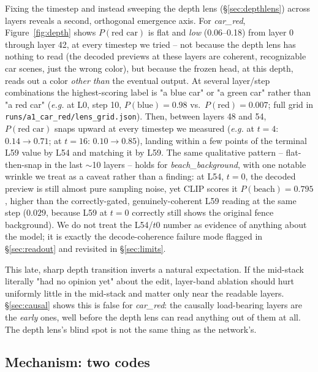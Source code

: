 \documentclass[10pt,twocolumn]{article}
\newcommand{\eg}{\emph{e.g.}}
\begin{document}
Fixing the timestep and instead sweeping the depth lens (\S\ref{sec:depthlens})
across layers reveals a second, orthogonal emergence axis. For
\emph{car\_red}, Figure~\ref{fig:depth} shows $P(\text{red car})$ is flat
and \emph{low} (0.06--0.18) from layer 0 through layer 42, at every
timestep we tried -- not because the depth lens has nothing to read
(the decoded previews at these layers are coherent, recognizable car
scenes, just the wrong color), but because the frozen head, at this
depth, reads out a color \emph{other than} the eventual output. At
several layer/step combinations the highest-scoring label is "a blue
car" or "a green car" rather than "a red car" (\eg{} at L0, step 10,
$P(\text{blue})=0.98$ vs.\ $P(\text{red})=0.007$; full grid in
\texttt{runs/a1\_car\_red/lens\_grid.json}). Then, between layers 48 and
54, $P(\text{red car})$ snaps upward at every timestep we measured (\eg{}
at $t{=}4$: $0.14\to0.71$; at $t{=}16$: $0.10\to0.85$), landing within a
few points of the terminal L59 value by L54 and matching it by L59. The
same qualitative pattern -- flat-then-snap in the last $\sim$10 layers --
holds for \emph{beach\_background}, with one notable wrinkle we treat as
a caveat rather than a finding: at L54, $t{=}0$, the decoded preview is
still almost pure sampling noise, yet CLIP scores it $P(\text{beach})=0.795$,
higher than the correctly-gated, genuinely-coherent L59 reading at the
same step ($0.029$, because L59 at $t{=}0$ correctly still shows the
original fence background). We do not treat the L54/$t$0 number as
evidence of anything about the model; it is exactly the decode-coherence
failure mode flagged in \S\ref{sec:readout} and revisited in
\S\ref{sec:limits}.

This late, sharp depth transition inverts a natural expectation. If the
mid-stack literally "had no opinion yet" about the edit, layer-band
ablation should hurt uniformly little in the mid-stack and matter only
near the readable layers. \S\ref{sec:causal} shows this is false for
\emph{car\_red}: the causally load-bearing layers are the \emph{early}
ones, well before the depth lens can read anything out of them at all.
The depth lens's blind spot is not the same thing as the network's.
\subsection{Mechanism: two codes}\label{sec:mechanism}
\end{document}

